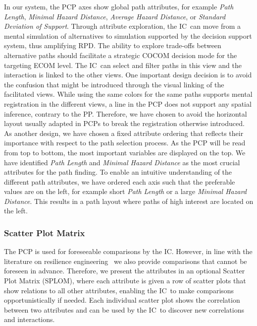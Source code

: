 \documentclass[conference,10pt,letter]{IEEEtran}
\def\IC{IC}
\begin{document}
In our system, the PCP axes show global path attributes, for example \emph{Path Length}, \emph{Minimal Hazard Distance}, \emph{Average Hazard Distance}, or \emph{Standard Deviation of Support}. Through attribute exploration, the \IC\ can move from a mental simulation of alternatives to simulation supported by the decision support system, thus amplifying RPD. The ability to explore trade-offs between alternative paths should facilitate a strategic COCOM decision mode for the targeting ECOM level. The \IC\ can select and filter paths in this view and the interaction is linked to the other views. One important design decision is to avoid the confusion that might be introduced through the visual linking of the facilitated views. While using the same colors for the same paths supports mental registration in the different views, a line in the PCP does not support any spatial inference, contrary to the PP. Therefore, we have chosen to avoid the horizontal layout usually adapted in PCPs to break the registration otherwise introduced. As another design, we have chosen a fixed attribute ordering that reflects their importance with respect to the path selection process. As the PCP will be read from top to bottom, the most important variables are displayed on the top. We have identified \emph{Path Length} and \emph{Minimal Hazard Distance} as the most crucial attributes for the path finding. To enable an intuitive understanding of the different path attributes, we have ordered each axis such that the preferable values are on the left, for example short \emph{Path Length} or a large \emph{Minimal Hazard Distance}. This results in a path layout where paths of high interest are located on the left.

\subsubsection{Scatter Plot Matrix} \label{sec:overview:analysis:scatter}
The PCP is used for foreseeable comparisons by the \IC . However, in line with the literature on resilience engineering~\cite{Lundberg2012} we also provide comparisons that cannot be foreseen in advance. Therefore, we present the attributes in an optional Scatter Plot Matrix (SPLOM), where each attribute is given a row of scatter plots that show relations to all other attributes, enabling the \IC\ to make comparisons opportunistically if needed. Each individual scatter plot shows the correlation between two attributes and can be used by the \IC\ to discover new correlations and interactions.
\end{document}
